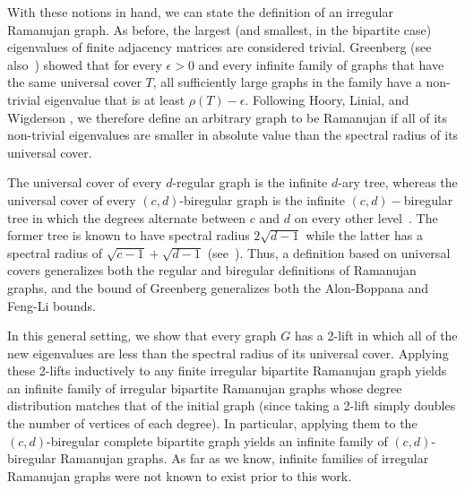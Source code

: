 \documentclass[11pt]{article}
\begin{document}
With these notions in hand, we can state the definition of an irregular
  Ramanujan graph.
As before, the largest (and smallest, in the bipartite case) eigenvalues
  of finite adjacency matrices are considered trivial.
Greenberg \cite{greenberg} (see also~\cite{cioabua2006eigenvalues})
  showed that for every $\epsilon > 0$ and every
  infinite family of graphs that have the same universal cover $T$,
  all sufficiently large graphs in the family have a non-trivial eigenvalue
  that is at least $\rho (T) - \epsilon$.
Following Hoory, Linial, and Wigderson \cite[Definition
  6.7]{hoory2006expander}, we therefore define an arbitrary graph to be Ramanujan if all of its
  non-trivial eigenvalues are smaller in absolute value than the spectral 
  radius of its universal cover.

The universal cover of every $d$-regular graph is the infinite $d$-ary tree, whereas the universal 
  cover of every $(c,d)$-biregular graph is the infinite $(c,d)-$biregular tree in which the degrees alternate between $c$ and $d$ on every other level~\cite{LiSole}.
The former tree is known to have spectral radius $2 \sqrt{d-1}$ while the latter has
  a spectral radius of $\sqrt{c-1} + \sqrt{d-1}$ (see~\cite{godsilMohar,LiSole}).
Thus, a definition based on universal covers generalizes both the regular and
  biregular definitions of Ramanujan graphs, and the bound of 
  Greenberg generalizes both the Alon-Boppana and Feng-Li bounds.

In this general setting, we show that every graph $G$ has a 2-lift in which all of the new eigenvalues
  are less than the spectral radius of its universal cover.
Applying these 2-lifts inductively to any finite irregular bipartite Ramanujan graph yields an
  infinite family of irregular bipartite Ramanujan graphs whose degree distribution
  matches that of the initial graph (since taking a 2-lift simply doubles the
  number of vertices of each degree).
In particular, applying them to the
  $(c,d)$-biregular complete bipartite graph yields an infinite family of
  $(c,d)$-biregular Ramanujan graphs.
As far as we know, infinite families of irregular Ramanujan graphs were not
  known to exist prior to this work.


\end{document}
